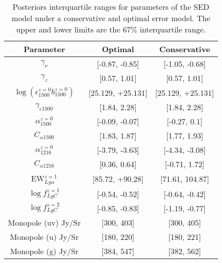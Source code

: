 \documentclass[fleqn,usenatbib]{mnras}
\begin{document}


\begin{table}
  \begin{center}
        \caption{\label{tab:table2} Posteriors interquartile ranges for parameters of the SED model under a conservative and optimal error model. The upper and lower limits are the 67$\%$ interquartile range. }
    \begin{tabular}{c c c}
      \textbf{Parameter} & \textbf{Optimal} & \textbf{Conservative} \\
      \hline
      $\gamma_{\nu}$ & [-0.87, -0.85]& [-1.05, -0.68] \\ %
      $\gamma_{z}$ & [0.57, 1.01] &  [0.57, 1.01] \\ %
      $\log(\epsilon_{1500}^{z=0} b_{1500}^{z=0})$ & [25.129, +25.131] & [25.129, +25.131]  \\
      $\gamma_{\epsilon 1500}$ & [1.84, 2.28] & [1.84, 2.28] \\%
      $\alpha_{1500}^{z=0}$ & [-0.09, -0.07] & [-0.27, 0.1] \\
      $C_{\alpha 1500}$ & [1.83, 1.87] & [1.77, 1.93] \\
      $\alpha_{1216}^{z=0}$ & [-3.79, -3.63] & [-4.34, -3.08] \\
      $C_{\alpha 1216}$ & [0.36, 0.64] &  [-0.71, 1.72] \\
      EW$_{Ly\alpha}^{z=1}$ & [85.72, +90.28] & [71.61, 104.87] \\
      $\log f^{z=1}_{LyC}$ & [-0.54, -0.52] & [-0.64, -0.42]\\
      $\log f^{z=2}_{LyC}$ & [-0.85, -0.83] & [-1.19, -0.77]\\
      Monopole (uv) Jy/Sr & [300, 403] & [300, 405] \\
      Monopole (u) Jy/Sr & [180, 220] & [180, 221]\\
      Monopole (g) Jy/Sr & [384, 547] & [382, 562]\\
    \end{tabular}
  \end{center}
\end{table}
\end{document}
